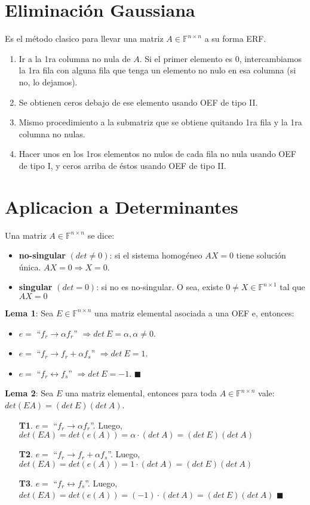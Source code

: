 \documentclass[11pt,a4paper]{article}
\newcommand*{\QEDA}{\null\nobreak\hfill\ensuremath{\blacksquare}}
\begin{document}
\section{Eliminaci\'on Gaussiana}
Es el m\'etodo clasico para llevar una matriz $A \in \mathbb{F}^{n \times n}$ a su forma ERF.
\begin{enumerate}
\itemsep-0.3em
\item Ir a la 1ra columna no nula de $A$. Si el primer elemento es 0, intercambiamos la 1ra fila con alguna fila que tenga un elemento no nulo en esa columna (si no, lo dejamos).
\item Se obtienen ceros debajo de ese elemento usando OEF de tipo II.
\item Mismo procedimiento a la submatriz que se obtiene quitando 1ra fila y la 1ra columna no nulas.
\item Hacer unos en los 1ros elementos no nulos de cada fila no nula usando OEF de tipo I, y ceros arriba de \'estos usando OEF de tipo II.
\end{enumerate}

\section{Aplicacion a Determinantes}
Una matriz $A \in \mathbb{F}^{n \times n}$ se dice:
\begin{itemize}
\itemsep-0.3em
\item \textbf{no-singular} $(det \not = 0)$: si el sistema homog\'eneo $AX=0$ tiene soluci\'on \'unica. $AX=0 \Rightarrow X=0$.
\item \textbf{singular} $(det = 0)$: si no es no-singular. O sea, existe $0 \not = X \in \mathbb{F}^{n \times 1}$ tal que $AX=0$
\end{itemize}

\textbf{Lema 1}: Sea $E \in \mathbb{F}^{n \times n}$ una matriz elemental asociada a una OEF e, entonces:
\begin{itemize}
\itemsep-0.3em
\item $e = $ ``$f_r \longrightarrow \alpha f_r$'' $\Longrightarrow det\ E = \alpha, \alpha \not = 0$.
\item $e = $ ``$f_r \longrightarrow f_r + \alpha f_s$'' $\Longrightarrow det\ E = 1$.
\item $e = $ ``$f_r \longleftrightarrow f_s$'' $\Longrightarrow det\ E = -1$. \QEDA\\
\end{itemize}

\textbf{Lema 2}: Sea $E$ una matriz elemental, entonces para toda $A \in \mathbb{F}^{n \times n}$ vale: $det(EA) = (det\ E)(det\ A)$.
\begin{itemize}
\itemsep-0.3em
\item[\textbf{T1}.] $e = $ ``$f_r \longrightarrow \alpha f_r$''. Luego, $det(EA) = det(e(A)) = \alpha \cdot (det\ A) = (det\ E)(det\ A)$
\item[\textbf{T2}.] $e = $ ``$f_r \longrightarrow f_r + \alpha f_s$''. Luego, $det(EA) = det(e(A)) = 1 \cdot (det\ A) = (det\ E)(det\ A)$ 
\item[\textbf{T3}.] $e = $ ``$f_r \longleftrightarrow f_s$''. Luego, $det(EA) = det(e(A)) = (-1) \cdot (det\ A) = (det\ E)(det\ A)$ \QEDA
\end{itemize}
\end{document}
